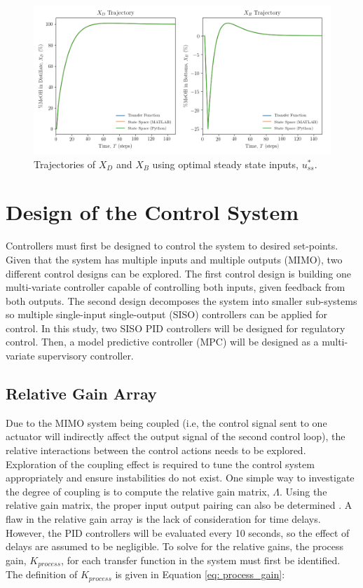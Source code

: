\begin{figure}[h]
     \centering
      \includegraphics[scale=0.42]{images/optimal_input_plots.png}
     \caption{Trajectories of $X_D$ and $X_B$ using optimal steady state inputs, $u_{ss}^*.$}
     \label{fig: optimal_ss_xd_xb}
\end{figure}

\section{Design of the Control System}
Controllers must first be designed to control the system to desired set-points.  Given that the system has multiple inputs and multiple outputs (MIMO), two different control designs can be explored.  The first control design is building one multi-variate controller capable of controlling both inputs, given feedback from both outputs.  The second design decomposes the system into smaller sub-systems so multiple single-input single-output (SISO) controllers can be applied for control.  In this study, two SISO PID controllers will be designed for regulatory control.  Then, a model predictive controller (MPC) will be designed as a multi-variate supervisory controller.  

\subsection{Relative Gain Array}
Due to the MIMO system being coupled (i.e, the control signal sent to one actuator will indirectly affect the output signal of the second control loop), the relative interactions between the control actions needs to be explored. Exploration of the coupling effect is required to tune the control system appropriately and ensure instabilities do not exist. One simple way to investigate the degree of coupling is to compute the relative gain matrix, $\Lambda$. Using the relative gain matrix, the proper input output pairing can also be determined \cite{RGA}. A flaw in the relative gain array is the lack of consideration for time delays.  However, the PID controllers will be evaluated every 10 seconds, so the effect of delays are assumed to be negligible.  To solve for the relative gains, the process gain, $K_{process}$, for each transfer function in the system must first be identified.  The definition of $K_{process}$ is given in Equation \ref{eq: process_gain}:

